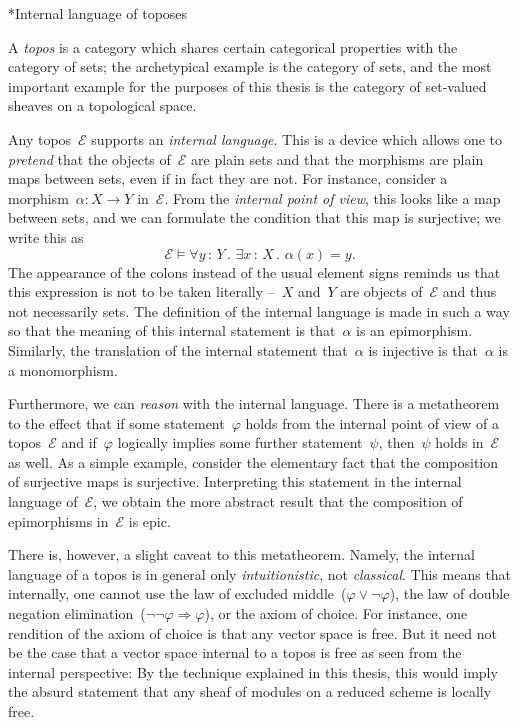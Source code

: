 \documentclass[10pt,reqno,a4paper]{amsbook}
\makeatletter
\theoremstyle{definition}
\theoremstyle{plain}
\theoremstyle{remark}
\newcommand{\E}{\mathcal{E}}
\newcommand{\?}{\,{:}\,}
\renewcommand{\_}{\mathpunct{.}\,}
\newcommand{\nocontentsline}[3]{}
\newcommand{\tocless}[1]{\let\addcontentsline=\nocontentsline}
\def\subsection{\@startsection{subsection}{2}%
  {0pt}{.5\linespacing\@plus.7\linespacing}{-.5em}%
  {\normalfont\bfseries}}
\makeatother
\begin{document}
{\tocless

\subsection*{Internal language of toposes}

A \emph{topos} is a category which shares certain categorical properties with
the category of sets; the archetypical example is the category of sets, and
the most important example for the purposes of this thesis is the category of
set-valued sheaves on a topological space.

Any topos~$\E$ supports an \emph{internal language}. This is a device which
allows one to \emph{pretend} that the objects of~$\E$ are plain sets and that
the morphisms are plain maps between sets, even if in fact they are not. For
instance, consider a morphism~$\alpha : X \to Y$ in~$\E$. From the \emph{internal
point of view}, this looks like a map between sets, and we can formulate the
condition that this map is surjective; we write this as
\[ \E \models \forall y\?Y\_ \exists x\?X\_ \alpha(x) = y. \]
The appearance of the colons instead of the usual element signs reminds us that
this expression is not to be taken literally --~$X$ and~$Y$ are objects of~$\E$
and thus not necessarily sets. The definition of the internal language is made
in such a way so that the meaning of this internal statement is that~$\alpha$
is an epimorphism. Similarly, the translation of the internal statement
that~$\alpha$ is injective is that~$\alpha$ is a monomorphism.

Furthermore, we can \emph{reason} with the internal language. There is a
metatheorem to the effect that if some statement~$\varphi$ holds from the
internal point of view of a topos~$\E$ and if~$\varphi$ logically implies some
further statement~$\psi$, then~$\psi$ holds in~$\E$ as well. As a simple
example, consider the elementary fact that the composition of surjective maps
is surjective. Interpreting this statement in the internal language of~$\E$, we
obtain the more abstract result that the composition of epimorphisms in~$\E$ is
epic.

There is, however, a slight caveat to this metatheorem. Namely, the internal
language of a topos is in general only \emph{intuitionistic}, not
\emph{classical}. This means that internally, one cannot use the law of
excluded middle~($\varphi \vee \neg\varphi$), the law of double negation
elimination~($\neg\neg\varphi \Rightarrow \varphi$), or the axiom of choice.
For instance, one rendition of the axiom of choice is that any vector space is
free. But it need not be the case that a vector space internal to a topos
is free as seen from the internal perspective: By the technique explained in
this thesis, this would imply the absurd statement that any sheaf of modules on
a reduced scheme is locally free.

}
\end{document}
